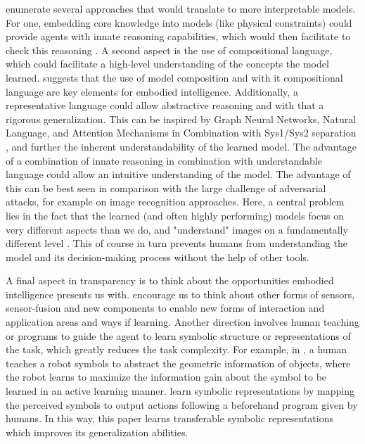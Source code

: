 \documentclass[twoside,11pt]{article}
\begin{document}
\citet{RoyEtAl:2021:RLRoboticsChallenges} enumerate several approaches that would translate to more interpretable models. For one, embedding core knowledge into models (like physical constraints) could provide agents with innate reasoning capabilities, which would then facilitate to check this reasoning \cite{HaSchmidhuber:2018:CoreKnowledgeWorldModels}. A second aspect is the use of compositional language, which could facilitate a high-level understanding of the concepts the model learned. \cite{Koditschek:2021:RoboticsCompositionalLanguage} suggests that the use of model composition and with it compositional language are key elements for embodied intelligence.
Additionally, a representative language could allow abstractive reasoning and with that a rigorous generalization. This can be inspired by Graph Neural Networks, Natural Language, and Attention Mechanisms in Combination with Sys1/Sys2 separation \cite{RoyEtAl:2021:RLRoboticsChallenges}, and further the inherent understandability of the learned model.
The advantage of a combination of innate reasoning in combination with understandable language could allow an intuitive understanding of the model. The advantage of this can be best seen in comparison with the large challenge of adversarial attacks, for example on image recognition approaches. Here, a central problem lies in the fact that the learned (and often highly performing) models focus on very different aspects than we do, and "understand" images on a fundamentally different level \cite{ChakrabortyEtAl:2021:SurveyAdversarialAttacks}. This of course in turn prevents humans from understanding the model and its decision-making process without the help of other tools.

A final aspect in transparency is to think about the opportunities embodied intelligence presents us with. \citet{RoyEtAl:2021:RLRoboticsChallenges} encourage us to think about other forms of sensors, sensor-fusion and new components to enable new forms of interaction and application areas and ways if learning. Another direction involves human teaching \citep{kulick2013active} or programs \citep{PenkovR19,sun2019program} to guide the agent to learn symbolic structure or representations of the task, which greatly reduces the task complexity. For example, in \citep{kulick2013active}, a human teaches a robot symbols to abstract the geometric information of objects, where the robot learns to maximize the information gain about the symbol to be learned in an active learning manner. \citet{PenkovR19} learn symbolic representations by mapping the perceived symbols to output actions following a beforehand program given by humans. In this way, this paper learns transferable symbolic representations which improves its generalization abilities.
\end{document}
